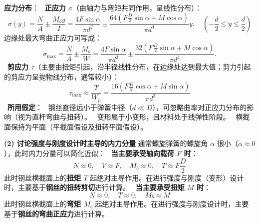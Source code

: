 \documentclass[11pt,a4paper]{ctexrep}
\begin{document}
{\textbf{应力分布}：
\noindent\textbullet\ \textbf{正应力 $\sigma$}（由轴力与弯矩共同作用，呈线性分布）：
  \[
  \sigma(y) = \frac{N}{A} \pm \frac{M_b y}{I}
  = \frac{4 F \sin\alpha}{\pi d^2}
  \pm \frac{64 \left( F \frac{D}{2} \sin\alpha + M \cos\alpha \right)}{\pi d^4} y,
  \quad \left(-\frac d2\le y\le \frac d2\right)
  \]
  边缘处最大弯曲正应力可写成：
  \[
  \sigma_{\max} = \frac{N}{A} \pm \frac{M_b}{W}
  = \frac{4F\sin\alpha}{\pi d^2}
  \pm \frac{32\left(F\frac D2\sin\alpha+M\cos\alpha\right)}{\pi d^3}.
  \]
\noindent\textbullet\ \textbf{剪应力 $\tau$}（主要由扭矩引起，沿半径线性分布，在边缘处达到最大值；剪力引起的剪应力呈抛物线分布，通常较小）：
  \[
  \tau_{\max} \approx \frac{T}{W_p} = \frac{16 \left( F \frac{D}{2} \cos\alpha + M \sin\alpha \right)}{\pi d^3}
  \]
\noindent\textbullet\ \textbf{所用假定}：
\noindent\textbullet\ 钢丝直径远小于弹簧中径（$d \ll D$），可忽略曲率对正应力分布的影响（视为直杆弯曲与扭转）。
\noindent\textbullet\ 变形属于小变形，且材料处于线弹性阶段。
\noindent\textbullet\ 横截面保持为平面（平截面假设及扭转平面假设）。

\textbf{(2) 讨论强度与刚度设计时主导的内力分量}
通常螺旋弹簧的螺旋角 $\alpha$ 很小（$\alpha \approx 0$），此时内力分量可以简化近似：
\noindent\textbullet\ \textbf{当主要承受轴向载荷 $F$ 时}：
  \[
  N \approx 0, \quad V \approx F, \quad M_b \approx 0, \quad T \approx F \frac{D}{2}
  \]
  此时钢丝横截面上的\textbf{扭矩 $T$} 起绝对主导作用。在进行强度与刚度（变形）设计时，主要基于\textbf{钢丝的扭转剪切}进行计算。
\noindent\textbullet\ \textbf{当主要承受扭矩 $M$ 时}：
  \[
  N \approx 0, \quad T \approx 0, \quad M_b \approx M
  \]
  此时钢丝横截面上的\textbf{弯矩 $M_b$} 起绝对主导作用。在进行强度与刚度设计时，主要基于\textbf{钢丝的弯曲正应力}进行计算。


}
\end{document}
